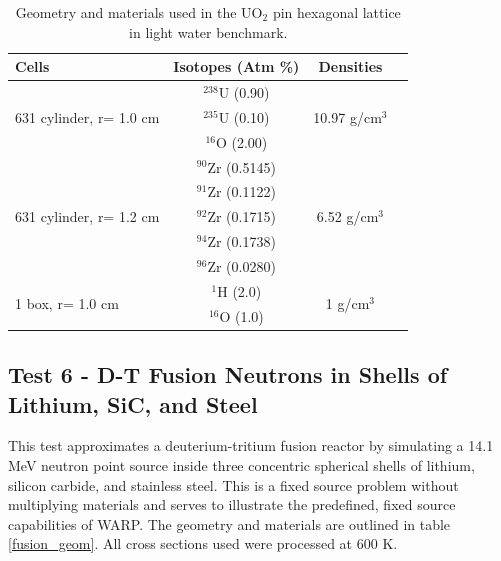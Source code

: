 \documentclass[preprint,12pt]{elsarticle}
\begin{document}
\begin{table}[h]
\centering
\caption{Geometry and materials used in the UO$_2$ pin hexagonal lattice in light water benchmark.}
\label{hex_geom}
\begin{tabular}{| l | c | c | c |}
\hline
Cells & Isotopes (Atm \%)& Densities \\
\hline
\multirow{3}{*}{631 cylinder, r= 1.0 cm }  &   $^{238}$U   (0.90) &    \multirow{3}{*}{10.97 g/cm$^3$} \\
                                           &   $^{235}$U   (0.10)& \\
                                           &   $^{16}$O    (2.00)& \\
\hline
\multirow{5}{*}{631 cylinder, r= 1.2 cm }  &   $^{90}$Zr   (0.5145) &    \multirow{5}{*}{6.52 g/cm$^3$} \\
                                           &   $^{91}$Zr   (0.1122)& \\
                                           &   $^{92}$Zr   (0.1715)& \\
                                           &   $^{94}$Zr   (0.1738)& \\
                                           &   $^{96}$Zr   (0.0280)& \\
\hline
\multirow{2}{*}{1 box, r= 1.0 cm }  &    $^{1}$H  (2.0) &    \multirow{2}{*}{1 g/cm$^3$} \\
                                    &   $^{16}$O  (1.0) & \\
\hline
\end{tabular}
\end{table}

\subsection{Test 6 - D-T Fusion Neutrons in Shells of Lithium, SiC, and Steel}

This test approximates a deuterium-tritium fusion reactor by simulating a 14.1 MeV neutron point source inside three concentric spherical shells of lithium, silicon carbide, and stainless steel.  This is a fixed source problem without multiplying materials and serves to illustrate the predefined, fixed source capabilities of WARP.   The geometry and materials are outlined in table \ref{fusion_geom}.  All cross sections used were processed at 600 K.
\end{document}
